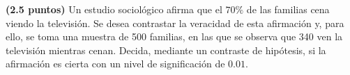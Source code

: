 
\textbf{(2.5 puntos)} Un estudio sociológico afirma que el $70\%$ de las familias cena viendo la televisión. Se desea contrastar la veracidad de esta afirmación y, para ello, se toma una muestra de 500 familias, en las que se observa que 340 ven la televisión mientras cenan. Decida, mediante un contraste de hipótesis, si la afirmación es cierta con un nivel de significación de $0.01$.
